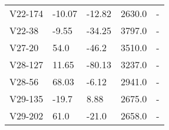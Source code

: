 \begin{longtable}{lllrl}
      V22-174 &   -10.07 &    -12.82 &     2630.0 &         - \\
       V22-38 &    -9.55 &    -34.25 &     3797.0 &         - \\
       V27-20 &     54.0 &     -46.2 &     3510.0 &         - \\
      V28-127 &    11.65 &    -80.13 &     3237.0 &         - \\
       V28-56 &    68.03 &     -6.12 &     2941.0 &         - \\
      V29-135 &    -19.7 &      8.88 &     2675.0 &         - \\
      V29-202 &     61.0 &     -21.0 &     2658.0 &         - \\
\end{longtable}
